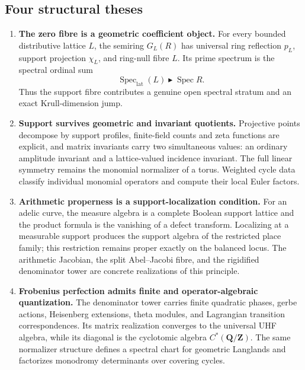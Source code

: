 \documentclass[11pt]{amsart}
\numberwithin{equation}{section}
\theoremstyle{definition}
\newcommand{\Z}{\mathbf Z}
\newcommand{\Q}{\mathbf Q}
\newcommand{\Spec}{\operatorname{Spec}}
\newcommand{\SpecLat}{\operatorname{Spec}_{\mathrm{lat}}}
\begin{document}
\subsection*{Four structural theses}

\begin{enumerate}[label=\textbf{T\arabic*.},leftmargin=3.8em]
\item \textbf{The zero fibre is a geometric coefficient object.}
For every bounded distributive lattice $L$, the semiring $G_L(R)$ has
universal ring reflection $p_L$, support projection $\chi_L$, and
ring-null fibre $L$.  Its prime spectrum is the spectral ordinal sum
\[
\SpecLat(L)\blacktriangleright\Spec R.
\]
Thus the support fibre contributes a genuine open spectral stratum and an
exact Krull-dimension jump.

\item \textbf{Support survives geometric and invariant quotients.}
Projective points decompose by support profiles, finite-field counts and
zeta functions are explicit, and matrix invariants carry two simultaneous
values: an ordinary amplitude invariant and a lattice-valued incidence
invariant.  The full linear symmetry remains the monomial normalizer of a
torus.  Weighted cycle data classify individual monomial operators and
compute their local Euler factors.

\item \textbf{Arithmetic properness is a support-localization condition.}
For an adelic curve, the measure algebra is a complete Boolean support
lattice and the product formula is the vanishing of a defect transform.
Localizing at a measurable support produces the support algebra of the
restricted place family; this restriction remains proper exactly on the
balanced locus.  The arithmetic Jacobian, the split Abel--Jacobi fibre, and
the rigidified denominator tower are concrete realizations of this
principle.

\item \textbf{Frobenius perfection admits finite and operator-algebraic
quantization.}
The denominator tower carries finite quadratic phases, gerbe actions,
Heisenberg extensions, theta modules, and Lagrangian transition
correspondences.  Its matrix realization converges to the universal UHF
algebra, while its diagonal is the cyclotomic algebra
$C^*(\Q/\Z)$.  The same normalizer structure defines a spectral chart for
geometric Langlands and factorizes monodromy determinants over covering
cycles.
\end{enumerate}
\end{document}
